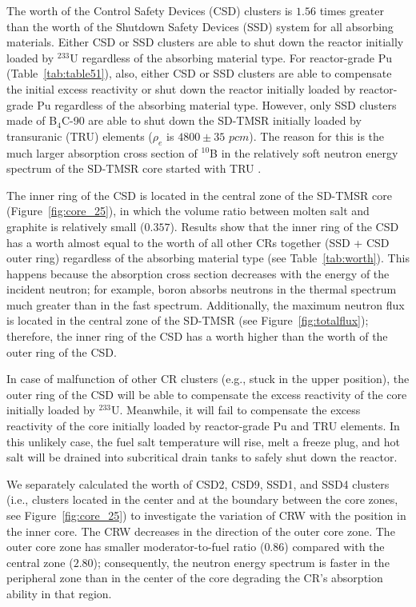 The worth of the Control Safety Devices (CSD) clusters is $1.56$ times greater than 
the worth of the Shutdown Safety Devices (SSD) system for all absorbing materials. Either CSD or SSD 
clusters are able to shut down the reactor initially loaded by 
$^{233}$U regardless of the absorbing material type.
For reactor-grade Pu (Table~\ref{tab:table51}), also, either CSD or SSD 
clusters are able to compensate the initial excess reactivity or shut down the reactor initially loaded by reactor-grade Pu regardless of the absorbing material type. However, only SSD clusters made of B$_4$C-90 are able to shut down the SD-TMSR 
initially loaded by transuranic (TRU) elements ($\rho_e$ is $4800\pm35$ $pcm$).
The reason for this is the much larger 
absorption cross section of $^{10}$B in the relatively soft neutron energy 
spectrum of the SD-TMSR core started with TRU \cite{ashraf2020Strategies}.

The inner ring of the CSD is located in the central zone of the SD-TMSR core 
(Figure~\ref{fig:core_25}), in which the volume ratio between molten salt and 
graphite is relatively small ($0.357$). Results show that the inner ring of the CSD has 
a worth almost equal to the worth of all other CRs together (SSD + CSD outer ring) regardless of 
the absorbing material type (see Table~\ref{tab:worth}). This happens because the absorption cross section
decreases with the energy of the incident neutron; for example, boron absorbs neutrons in the thermal spectrum much 
greater than in the fast spectrum. Additionally, the maximum neutron flux is located in the central zone of the SD-TMSR (see Figure~\ref{fig:totalflux}); therefore, the inner ring of the CSD has a worth higher than the worth of the outer ring of the CSD.

In case of malfunction of other CR clusters (e.g., stuck in the upper 
position), the outer ring of the CSD will be able to compensate the excess reactivity of the core initially loaded by $^{233}$U.
Meanwhile, it will fail to compensate the excess 
reactivity of the core initially loaded by reactor-grade Pu and TRU elements. In this unlikely case, the fuel salt temperature will rise, melt a freeze plug, and hot salt will be drained into subcritical drain tanks to safely shut down the reactor.

We separately calculated the worth of CSD2, CSD9, SSD1, and SSD4 clusters (i.e., clusters located in the center and at the boundary between the core
zones, see Figure~\ref{fig:core_25}) to investigate the variation of CRW with the position in the inner core.
The CRW decreases in the direction of the outer core zone. The outer core zone 
has smaller moderator-to-fuel ratio ($0.86$) compared with the central zone 
($2.80$); consequently, the neutron energy spectrum is faster in the peripheral 
zone than in the center of the core degrading the CR's 
absorption ability in that region.


